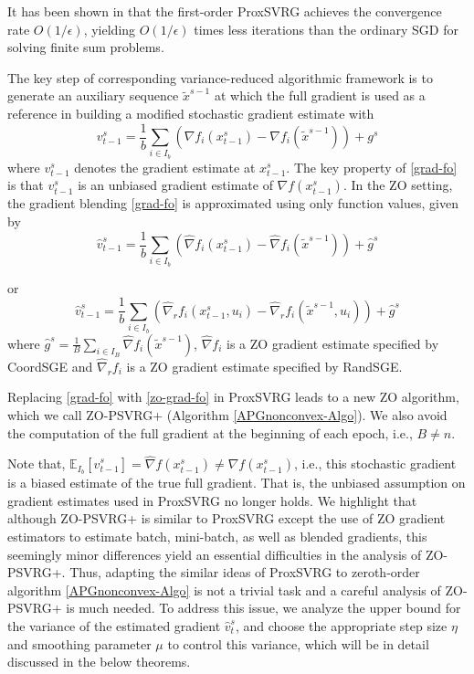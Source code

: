 \documentclass{article}
\newcommand*{\E}{\mathbb{E}}
\theoremstyle{definition}
\theoremstyle{remark}
\begin{document}
{\color{Green}
 {\color{Brown}It has been shown in \cite{johnson2013accelerating,reddi2016stochastic,li2018simple} that the first-order ProxSVRG achieves the convergence rate $O(1/\epsilon )$, yielding $O(1/\epsilon)$ times less iterations than the ordinary SGD for solving finite sum problems.}
{\color{Green}
{\color{Brown} The key step of corresponding variance-reduced algorithmic framework is to generate an auxiliary sequence $\tilde{x}^{s-1}$ at which the full gradient is used as a reference in building a modified stochastic gradient estimate with
\begin{equation}\label{grad-fo}
{{v}}_{t-1}^s = \frac{1}{b} \sum_{i\in I_b}\left({\nabla} f_{i}(x_{t-1}^s)-{\nabla} f_{i}(\tilde{x}^{s-1})\right)+{g}^s
\end{equation}
where ${{v}}_{t-1}^s$ denotes the gradient estimate at $x_{t-1}^s$. The key property of \eqref{grad-fo} is that ${{v}}_{t-1}^s$ is an unbiased gradient estimate of $\nabla f(x_{t-1}^s)$. In the ZO setting, the gradient blending \eqref{grad-fo} is approximated using only function values, given by
\begin{equation}\label{zo-grad-fo}
{\hat{v}}_{t-1}^s = \frac{1}{b} \sum_{i\in I_b}\left(\hat{\nabla} f_{i}(x_{t-1}^s)-\hat{\nabla} f_{i}(\tilde{x}^{s-1})\right)+\hat{g}^s
\end{equation}

or 
{\color{Sepia}
\begin{equation}\label{zo-grad-fo-rand}
{\hat{v}}_{t-1}^s = \frac{1}{b} \sum_{i\in I_b}\left(\hat{\nabla}_r f_{i}(x_{t-1}^s, u_i)-\hat{\nabla}_r f_{i}(\tilde{x}^{s-1}, u_i)\right)+\hat{g}^s
\end{equation}
}
where $\hat{g}^s= \frac{1}{B}\sum_{i\in I_B}\hat{\nabla} f_{i}(\tilde{x}^{s-1})$,   $\hat{\nabla} f_{i}$ is a ZO gradient estimate specified by CoordSGE and $\hat{\nabla}_r f_{i}$ is a ZO gradient estimate specified by RandSGE.  

Replacing \eqref{grad-fo} with \eqref{zo-grad-fo} in ProxSVRG leads to a new ZO
algorithm, which we call ZO-PSVRG+ (Algorithm \ref{APGnonconvex-Algo}). We also avoid the computation of the full gradient at the beginning of each epoch, i.e., $B \neq n$.
}
Note that, $\E_{I_b}[\hat{v}_{t-1}^s] = \hat{\nabla} f(x_{t-1}^s) \neq {\nabla} f(x_{t-1}^s)$, i.e., this stochastic gradient is a biased estimate of the true full gradient.
{\color{Brown} That is, the unbiased assumption on gradient estimates used in ProxSVRG \cite{reddi2016proximal,li2018simple} no longer holds. We highlight that although ZO-PSVRG+ is similar
to ProxSVRG except the use of ZO gradient estimators to estimate batch, mini-batch, as well as blended
gradients, this seemingly minor differences yield an essential difficulties in the analysis of ZO-PSVRG+.
}
Thus, adapting the similar ideas of ProxSVRG to zeroth-order algorithm \ref{APGnonconvex-Algo} is not a trivial task {\color{Brown} and a careful analysis of ZO-PSVRG+ is much needed.} To address this issue, we analyze the upper bound for the variance of the estimated gradient $\hat{v}_t^s$, and choose the appropriate step size $\eta$ and smoothing parameter $\mu$ to control
this variance, which will be in detail discussed in the below theorems.
}
}
\end{document}
